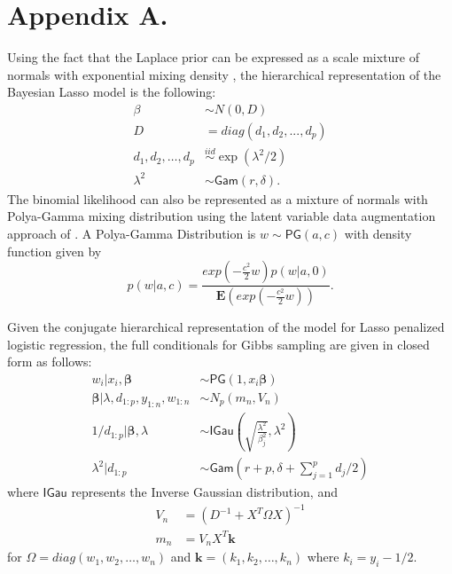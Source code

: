 \documentclass[twoside,11pt]{article}
\newcommand{\bbeta}{\boldsymbol{\beta}}
\newcommand{\Gam}{\mathsf{Gam}}
\newcommand{\IGau}{\mathsf{IGau}}
\newcommand{\PG}{\mathsf{PG}}
\begin{document}


\appendix
\section*{Appendix A.}

Using the fact that the Laplace prior can be expressed as a scale mixture
of normals with exponential mixing density \citep{ParkCasella08}, the hierarchical representation of the Bayesian Lasso model is the following:
\begin{align*}
\beta & \sim N(0,D)\\
D &= diag(d_1,d_2,...,d_p)\\
d_1, d_2, \ldots, d_p & \stackrel{iid}{\sim} \exp(\lambda^2/2)\\
\lambda^2 & \sim \Gam(r,\delta).
\end{align*}
The binomial likelihood can also be represented as a mixture of
normals with Polya-Gamma mixing distribution using the latent variable data augmentation approach of \cite{PolsonScott13}. A Polya-Gamma Distribution is $w \sim \PG(a,c)$ with density function given by
\begin{equation*}
p(w|a,c)=\frac{exp(-\frac{c^2}{2}w)p(w|a,0)}{\mathbf{E}(exp(-\frac{c^2}{2}w))}.
\end{equation*}

Given the conjugate hierarchical representation of the model for Lasso penalized logistic regression, the full conditionals for Gibbs sampling are given in closed form as follows:
\begin{align*}
w_i | x_i, \bbeta & \sim \PG(1,x_i\bbeta) \\
\bbeta | \lambda, d_{1:p}, y_{1:n}, w_{1:n} & \sim N_p(m_n,V_n)\\
1/d_{1:p} | \bbeta, \lambda & \sim \IGau \left(\sqrt{\frac{\lambda^2}{\beta_j^2}},\lambda^2 \right)\\
\lambda^2| d_{1:p}  & \sim \Gam \left( r + p, \delta + \sum_{j=1}^p d_j/2 \right)
\end{align*}
where $\IGau$ represents the Inverse Gaussian distribution, and
\begin{align*}
V_n & = (D^{-1} + X^T\Omega X)^{-1}\\
m_n & = V_n X^T\boldsymbol{k}
\end{align*}
for $\Omega  = diag(w_1, w_2, \ldots, w_n)$ and $\boldsymbol{k} = (k_1, k_2, \ldots, k_n)$ where $k_i = y_i - 1/2$.
\end{document}
